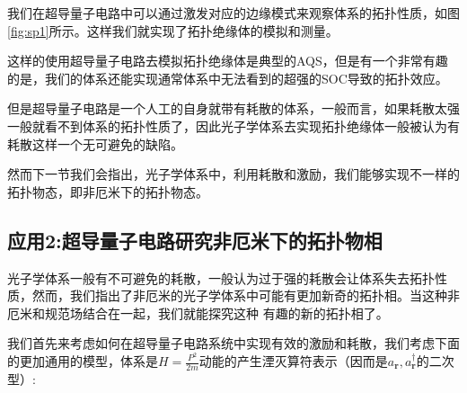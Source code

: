 \documentclass[supercite]{HustGraduPaper}
\def\r{\mathbf{r}}
\begin{document}
我们在超导量子电路中可以通过激发对应的边缘模式来观察体系的拓扑性质，如图\ref{fig:sp1}所示。这样我们就实现了拓扑绝缘体的模拟和测量。

这样的使用超导量子电路去模拟拓扑绝缘体是典型的AQS\cite{Wang2016}，但是有一个非常有趣的是，我们的体系还能实现通常体系中无法看到的超强的SOC导致的拓扑效应。

但是超导量子电路是一个人工的自身就带有耗散的体系，一般而言，如果耗散太强一般就看不到体系的拓扑性质了，因此光子学体系去实现拓扑绝缘体一般被认为有耗散这样一个无可避免的缺陷。

然而下一节我们会指出，光子学体系中，利用耗散和激励，我们能够实现不一样的拓扑物态，即非厄米下的拓扑物态。
   \subsection{应用2:超导量子电路研究非厄米下的拓扑物相}
   光子学体系一般有不可避免的耗散\cite{regensburger2012parity}，一般认为过于强的耗散会让体系失去拓扑性质\cite{st2017lasing}，然而，我们指出了非厄米的光子学体系中可能有更加新奇的拓扑相。当这种非厄米和规范场结合在一起\cite{Gong2018topo,malzard2015topologically,lourencco2018self,esaki2011edge,Shen2018,Osterloh2005,Goldman2009,zeuner2015observation,leykam2017edge,lee2016anomalous,yuan2014generation,Wu2015,sau2010generic,ozawa2018topological,Wu2013,feng2017non,Yao2018,Yao2018a}，我们就能探究这种
   有趣的新的拓扑相了\cite{harari2018topological}。
   
   我们首先来考虑如何在超导量子电路系统中实现有效的激励和耗散，我们考虑下面的更加通用的模型，体系是$H = \frac{P^2}{2m}$动能的产生湮灭算符表示（因而是$a_\r,a_\r^\dagger$的二次型）:
   
\end{document}
